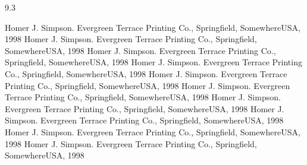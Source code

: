 \documentclass[a0]{a0poster}
\begin{document}
\framethin
\begin{area4}{9.3}
\vspace*{-70pt}
\small
\begin{thebibliography}{50}
 Homer J. Simpson. Evergreen Terrace Printing Co., Springfield, SomewhereUSA, 1998
 Homer J. Simpson. Evergreen Terrace Printing Co., Springfield, SomewhereUSA, 1998
 Homer J. Simpson. Evergreen Terrace Printing Co., Springfield, SomewhereUSA, 1998
 Homer J. Simpson. Evergreen Terrace Printing Co., Springfield, SomewhereUSA, 1998
 Homer J. Simpson. Evergreen Terrace Printing Co., Springfield, SomewhereUSA, 1998
 Homer J. Simpson. Evergreen Terrace Printing Co., Springfield, SomewhereUSA, 1998
 Homer J. Simpson. Evergreen Terrace Printing Co., Springfield, SomewhereUSA, 1998
 Homer J. Simpson. Evergreen Terrace Printing Co., Springfield, SomewhereUSA, 1998
 Homer J. Simpson. Evergreen Terrace Printing Co., Springfield, SomewhereUSA, 1998
 Homer J. Simpson. Evergreen Terrace Printing Co., Springfield, SomewhereUSA, 1998
\end{thebibliography}
\end{area4}

\logoscurves
\end{document}
